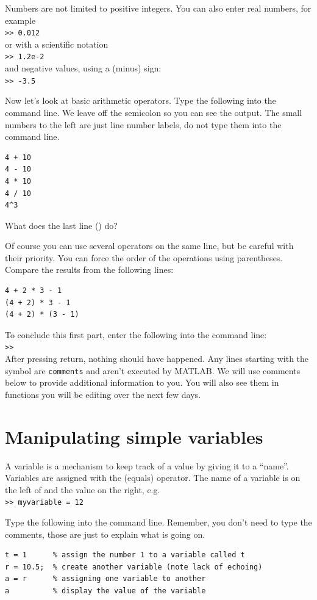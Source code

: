 \documentclass{article}
\begin{document}
Numbers are not limited to positive integers.
You can also enter real numbers, for example\\
\verb|>> 0.012|\\
or with a scientific notation\\
\verb|>> 1.2e-2|\\
and negative values, using a \mcode{-} (minus) sign:\\
\verb|>> -3.5|

Now let's look at basic arithmetic operators.
Type the following into the command line.
We leave off the semicolon so you can see the output.
The small numbers to the left are just line number labels, do not type them into the command line.

\begin{lstlisting}
4 + 10
4 - 10
4 * 10
4 / 10
4^3
\end{lstlisting}
What does the last line () do?

Of course you can use several operators on the same line, but be careful with their priority.
You can force the order of the operations using parentheses.
Compare the results from the following lines:
\begin{lstlisting}
4 + 2 * 3 - 1
(4 + 2) * 3 - 1
(4 + 2) * (3 - 1)
\end{lstlisting}

To conclude this first part, enter the following into the command line:\\
\verb|>>| \\
After pressing return, nothing should have happened.
Any lines starting with the \mcode{\%} symbol are \verb|comments| and aren't executed by MATLAB.
We will use comments below to provide additional information to you.
You will also see them in functions you will be editing over the next few days.


\section{Manipulating simple variables}

A variable is a mechanism to keep track of a value by giving it to a ``name''.
Variables are assigned with the \mcode{=} (equals) operator.
The name of a variable is on the left of \mcode{=} and the value on the right, e.g.\\
\verb|>> myvariable = 12|

Type the following into the command line.
Remember, you don't need to type the comments, those are just to explain what is going on.
\begin{lstlisting}
t = 1      % assign the number 1 to a variable called t
r = 10.5;  % create another variable (note lack of echoing)
a = r      % assigning one variable to another
a          % display the value of the variable
\end{lstlisting}
\end{document}
